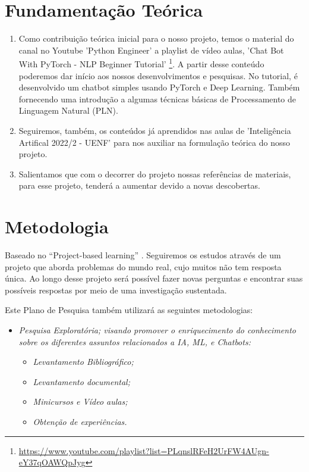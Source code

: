 

\chapter[Fundamentação Teórica]{Fundamentação Teórica}\label{Fundamentacao}
\begin{enumerate}
   \item  Como contribuição teórica inicial para o nosso projeto, temos o material do canal no Youtube 'Python Engineer' a playlist de vídeo aulas,  'Chat Bot With PyTorch - NLP Beginner Tutorial' \footnote{\url{https://www.youtube.com/playlist?list=PLqnslRFeH2UrFW4AUgn-eY37qOAWQpJyg}}. A partir desse conteúdo poderemos dar início aos nossos desenvolvimentos e pesquisas. No tutorial, é desenvolvido um chatbot simples usando PyTorch e Deep Learning. Também fornecendo uma introdução a algumas técnicas básicas de Processamento de Linguagem Natural (PLN).

   \item Seguiremos, também, os conteúdos já aprendidos nas aulas de  'Inteligência Artifical 2022/2 - UENF' para nos auxiliar na formulação teórica do nosso projeto.

   \item  Salientamos que com o decorrer do projeto nossas referências de materiais, para esse projeto, tenderá a aumentar devido a novas descobertas.
\end{enumerate}







\chapter[Metodologia]{Metodologia}

Baseado no “Project-based learning” \cite{krajcik2006project}. Seguiremos os estudos através de um projeto que aborda problemas do mundo real, cujo muitos não tem resposta única. Ao longo desse projeto será possível fazer novas perguntas e encontrar suas possíveis respostas por meio de uma investigação sustentada.

\justifying
\vspace {1mm}

Este Plano de Pesquisa também utilizará as seguintes metodologias:
\begin{itemize}
   \item \textit{Pesquisa Exploratória; visando promover o enriquecimento do conhecimento sobre os diferentes assuntos relacionados a IA, ML, e Chatbots:
         }
         \begin{itemize}
            \item \textit{Levantamento Bibliográfico;}
            \item \textit{Levantamento documental;}
            \item \textit{Minicursos e Vídeo aulas;}
            \item \textit{Obtenção de experiências.}
         \end{itemize}
\end{itemize}

